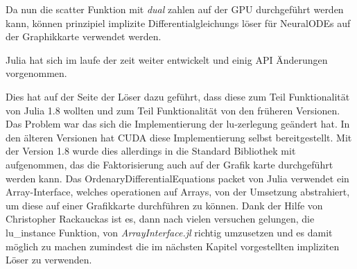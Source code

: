 Da nun die scatter Funktion mit \textit{dual} zahlen auf der GPU durchgeführt werden kann, 
können prinzipiel implizite Differentialgleichungs löser für 
NeuralODEs auf der Graphikkarte verwendet werden.

Julia hat sich im laufe der zeit weiter entwickelt und einig API Änderungen vorgenommen.

Dies hat auf der Seite der Löser dazu geführt, dass diese zum Teil Funktionalität von Julia 1.8 wollten 
und zum Teil Funktionalität von den früheren Versionen.
Das Problem war das sich die Implementierung der lu-zerlegung geändert hat. %
In den älteren Versionen hat CUDA diese Implementierung selbst bereitgestellt.
Mit der Version 1.8 wurde dies allerdings in die Standard Bibliothek mit aufgenommen, das die Faktorisierung 
auch auf der Grafik karte durchgeführt werden kann.
Das OrdenaryDifferentialEquations packet von Julia verwendet 
ein Array-Interface, welches operationen auf Arrays, 
von der Umsetzung abstrahiert, um diese auf einer Grafikkarte durchführen zu können.
Dank der Hilfe von Christopher Rackauckas ist es, dann nach vielen versuchen gelungen, die lu\_instance Funktion, von \textit{ArrayInterface.jl} richtig umzusetzen 
und es damit möglich zu machen zumindest die im nächsten Kapitel vorgestellten impliziten Löser zu verwenden.


